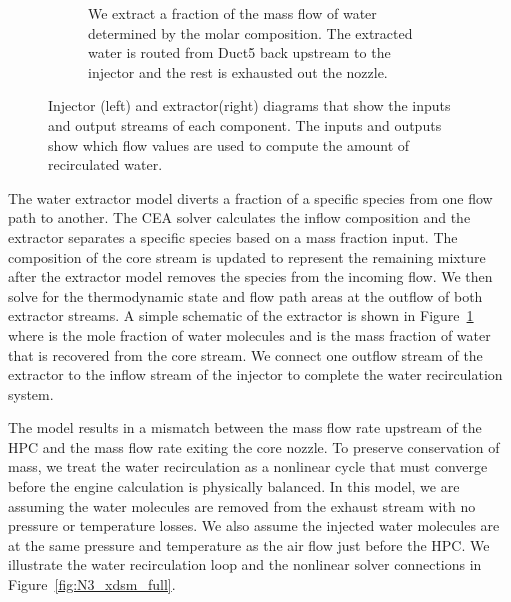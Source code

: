 \documentclass[conf]{new-aiaa}
\begin{document}
\begin{figure}[hbt!]
\begin{subfigure}[t]{0.49\textwidth}
        \caption{
            We extract a fraction of the mass flow of water determined by the molar composition.
            The extracted water is routed from Duct5 back upstream to the injector and the rest is exhausted out the nozzle.
        }
        \label{fig:extractor}
    \end{subfigure}
    \caption{Injector (left) and extractor(right) diagrams that show the inputs and output streams of each component.
        The inputs and outputs show which flow values are used to compute the amount of recirculated water.}
    \label{fig:extract_inject}
\end{figure}

The water extractor model diverts a fraction of a specific species from one flow path to another.
The CEA solver calculates the inflow composition and the extractor separates a specific species based on a mass fraction input.
The composition of the core stream is updated to represent the remaining mixture after the extractor model removes the species from the incoming flow.
We then solve for the thermodynamic state and flow path areas at the outflow of both extractor streams.
A simple schematic of the extractor is shown in Figure~\ref{fig:extractor} where  is the mole fraction of water molecules and  is the mass fraction of water that is recovered from the core stream.
We connect one outflow stream of the extractor to the inflow stream of the injector to complete the water recirculation system.

The model results in a mismatch between the mass flow rate upstream of the HPC and the mass flow rate exiting the core nozzle.
To preserve conservation of mass, we treat the water recirculation as a nonlinear cycle that must converge before the engine calculation is physically balanced.
In this model, we are assuming the water molecules are removed from the exhaust stream with no pressure or temperature losses.
We also assume the injected water molecules are at the same pressure and temperature as the air flow just before the HPC.
We illustrate the water recirculation loop and the nonlinear solver connections in Figure~\ref{fig:N3_xdsm_full}.
\end{document}
